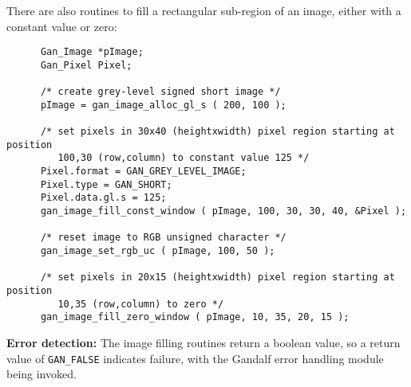 There are also routines to fill a rectangular sub-region of an image,
either with a constant value or zero:
\begin{verbatim}
      Gan_Image *pImage;
      Gan_Pixel Pixel;

      /* create grey-level signed short image */
      pImage = gan_image_alloc_gl_s ( 200, 100 );

      /* set pixels in 30x40 (heightxwidth) pixel region starting at position
         100,30 (row,column) to constant value 125 */
      Pixel.format = GAN_GREY_LEVEL_IMAGE;
      Pixel.type = GAN_SHORT;
      Pixel.data.gl.s = 125;
      gan_image_fill_const_window ( pImage, 100, 30, 30, 40, &Pixel );

      /* reset image to RGB unsigned character */
      gan_image_set_rgb_uc ( pImage, 100, 50 );

      /* set pixels in 20x15 (heightxwidth) pixel region starting at position
         10,35 (row,column) to zero */
      gan_image_fill_zero_window ( pImage, 10, 35, 20, 15 );
\end{verbatim}

{\bf Error detection:} The image filling routines return a boolean value,
so a return value of {\tt GAN\_FALSE} indicates failure, with the Gandalf
error handling module being invoked.

